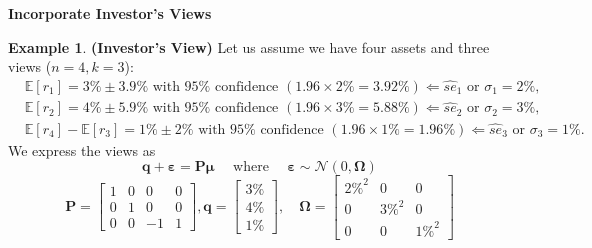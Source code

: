\documentclass[13pt]{article}
\theoremstyle{definition}
\newtheorem{example}[theorem]{Example}
\theoremstyle{remark}
\begin{document}
{\color{C6}\textbf{Incorporate Investor's Views}}\label{subsubsec:investor's views}
\begin{example}
\textbf{(Investor's View)} Let us assume we have four assets and three views ($n=4, k=3$):
$$
\begin{aligned}
& \mathbb{E}\left[r_{1}\right]=3 \% \pm 3.9 \% \text { with } 95 \% \text { confidence }(1.96 \times 2 \%=3.92 \%) \Longleftarrow\hat{se}_1 \text { or }\sigma_1=2\%,\\
& \mathbb{E}\left[r_{2}\right]=4 \% \pm 5.9 \% \text { with } 95 \% \text { confidence }(1.96 \times 3 \%=5.88 \%)\Longleftarrow\hat{se}_2 \text { or }\sigma_2=3\%, \\
& \mathbb{E}\left[r_{4}\right]-\mathbb{E}\left[r_{3}\right]=1 \% \pm 2 \% \text { with } 95 \% \text { confidence }(1.96 \times 1 \%=1.96 \%)\Longleftarrow\hat{se}_3 \text { or }\sigma_3=1\%.
\end{aligned}
$$
We express the views as
$$
\bm{q}+\bm{\bm{\varepsilon}}=\mathbf{P} \bm{\mu} \quad \text { where } \quad \bm{\bm{\varepsilon}} \sim \mathcal{N}(0, \mathbf{\Omega})
$$
$$
\mathbf{P}=\left[\begin{array}{cccc}
1 & 0 & 0 & 0 \\
0 & 1 & 0 & 0 \\
0 & 0 & -1 & 1
\end{array}\right], \bm{q}=\left[\begin{array}{l}
3 \% \\
4 \% \\
1 \%
\end{array}\right], \quad \mathbf{\Omega}=\left[\begin{array}{ccc}
2 \%^{2} & 0 & 0 \\
0 & 3 \%^{2} & 0 \\
0 & 0 & 1 \%^{2}
\end{array}\right]
$$
\end{example}
\end{document}
